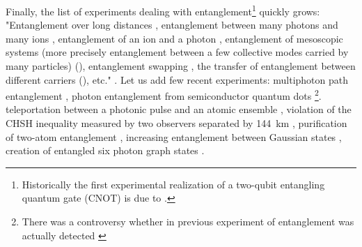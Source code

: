 \documentclass[twocolumn,aps,rmp]{revtex4}
\begin{document}
Finally, the list of experiments dealing with
entanglement\footnote{Historically the first experimental realization
  of a two-qubit entangling quantum gate (CNOT) is due to
  \cite{WinelandFirstGate}.} quickly grows: "Entanglement over long
distances \cite {TittelBGZ1,TittelBGZ2,13,WeihsRWZ,33}, entanglement
between many photons \cite{34} and many ions \cite{35}, entanglement
of an ion and a photon \cite {36,37}, entanglement of mesoscopic
systems (more precisely entanglement between a few collective modes
carried by many particles) (\cite {38,39,40G}), entanglement swapping
\cite {exp_ent_swapping,42}, the transfer of entanglement between
different carriers (\cite {44}), etc." \cite {NG}. Let us add few
recent experiments: multiphoton path entanglement \cite {EisenbergHKB},
photon entanglement from semiconductor quantum dots
\cite{Akopian2006}\footnote{There was a controversy
whether in previous experiment of \cite{Stevenson-nature2005} entanglement was  actually detected  \cite{Avron-comment}}.
teleportation between a photonic pulse and an atomic ensemble
\cite{Polzik2006-foton-atom}, violation of the CHSH inequality
measured by two observers separated by 144~km \cite {144km}, purification of two-atom entanglement \cite {ReichleLKBBJLOSW2006},  increasing entanglement between Gaussian states
\cite{OurjoumtsevDTG2007}, creation of entangled six photon graph states \cite {LuZGGZSGYP2007}.
\end{document}
